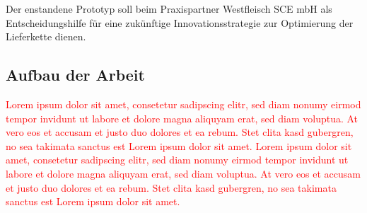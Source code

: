 Der enstandene Prototyp soll beim Praxispartner Westfleisch SCE mbH als Entscheidungshilfe für eine zukünftige Innovationsstrategie zur Optimierung der Lieferkette dienen.

\subsection{Aufbau der Arbeit}

\textcolor{red}{Lorem ipsum dolor sit amet, consetetur sadipscing elitr, sed diam nonumy eirmod tempor invidunt ut labore et dolore magna aliquyam erat, sed diam voluptua. At vero eos et accusam et justo duo dolores et ea rebum. Stet clita kasd gubergren, no sea takimata sanctus est Lorem ipsum dolor sit amet. Lorem ipsum dolor sit amet, consetetur sadipscing elitr, sed diam nonumy eirmod tempor invidunt ut labore et dolore magna aliquyam erat, sed diam voluptua. At vero eos et accusam et justo duo dolores et ea rebum. Stet clita kasd gubergren, no sea takimata sanctus est Lorem ipsum dolor sit amet.}

\newpage
